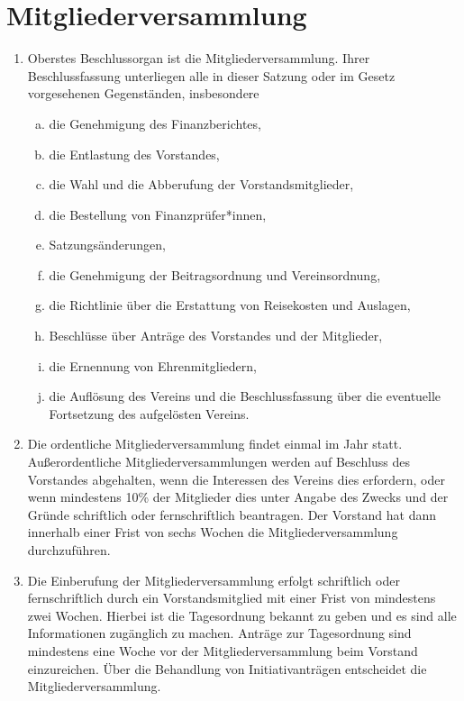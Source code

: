 \documentclass[a4paper]{article}
\begin{document}
\section{Mitgliederversammlung}
\begin{enumerate}
	\item Oberstes Beschlussorgan ist die Mitgliederversammlung. Ihrer Beschlussfassung unterliegen alle in dieser Satzung oder im Gesetz vorgesehenen Gegenständen, insbesondere
	\begin{enumerate}[a)]
		\item die Genehmigung des Finanzberichtes,
		\item die Entlastung des Vorstandes,
		\item die Wahl und die Abberufung der Vorstandsmitglieder,
		\item die Bestellung von Finanzprüfer*innen,
		\item Satzungsänderungen,
		\item die Genehmigung der Beitragsordnung und Vereinsordnung,
		\item die Richtlinie über die Erstattung von Reisekosten und Auslagen,
		\item Beschlüsse über Anträge des Vorstandes und der Mitglieder,
		\item die Ernennung von Ehrenmitgliedern,
		\item die Auflösung des Vereins und die Beschlussfassung über die eventuelle Fortsetzung des aufgelösten Vereins.
	\end{enumerate}
	\item Die ordentliche Mitgliederversammlung findet einmal im Jahr statt. Außerordentliche Mitgliederversammlungen werden auf Beschluss des Vorstandes abgehalten, wenn die Interessen des Vereins dies erfordern, oder wenn mindestens 10\% der Mitglieder dies unter Angabe des Zwecks und der Gründe schriftlich oder fernschriftlich beantragen. Der Vorstand hat dann innerhalb einer Frist von sechs Wochen die Mitgliederversammlung durchzuführen. 

	\item Die Einberufung der Mitgliederversammlung erfolgt schriftlich oder fernschriftlich durch ein Vorstandsmitglied mit einer Frist von mindestens zwei Wochen. Hierbei ist die Tagesordnung bekannt zu geben und es sind alle Informationen zugänglich zu machen. Anträge zur Tagesordnung sind mindestens eine Woche vor der Mitgliederversammlung beim Vorstand einzureichen. Über die Behandlung von Initiativanträgen entscheidet die Mitgliederversammlung.


\end{enumerate}
\end{document}
